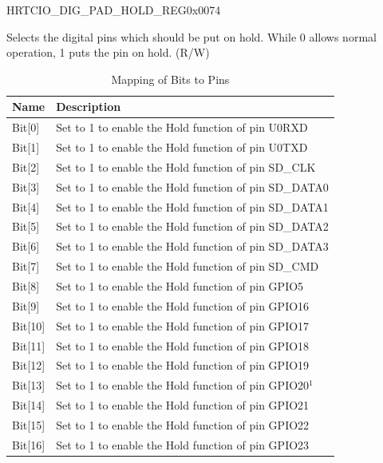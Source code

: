 \clearpage
\begin{register}{H}{RTCIO\_DIG\_PAD\_HOLD\_REG}{0x0074}\label{regdesc:RTCIODIGPADHOLDREG}
%
\regnewline%
\begin{regdesc}\begin{reglist}
\item [RTCIO\_DIG\_PAD\_HOLD\_REG]Selects the digital pins which should be put on hold. While 0 allows normal operation, 1 puts the pin on hold. (R/W)
\end{reglist}\end{regdesc}
\end{register}
\begin{longtable}[c]{ | p{5.5cm} | p{7.5cm} | }
\caption{Mapping of Bits to Pins}\label{tab:hold-bit-mapping}
\\\hline
\rowcolor{lightgray}
\textbf{Name} & \textbf{Description} \\ \hline
\endhead
Bit[0] & Set to 1 to enable the Hold function of pin U0RXD\\\hline
Bit[1] & Set to 1 to enable the Hold function of pin U0TXD\\\hline
Bit[2] & Set to 1 to enable the Hold function of pin SD\_CLK\\\hline
Bit[3] & Set to 1 to enable the Hold function of pin SD\_DATA0\\\hline
Bit[4] & Set to 1 to enable the Hold function of pin SD\_DATA1\\\hline
Bit[5] & Set to 1 to enable the Hold function of pin SD\_DATA2\\\hline
Bit[6] & Set to 1 to enable the Hold function of pin SD\_DATA3\\\hline
Bit[7] & Set to 1 to enable the Hold function of pin SD\_CMD\\\hline
Bit[8] & Set to 1 to enable the Hold function of pin GPIO5\\\hline
Bit[9] & Set to 1 to enable the Hold function of pin GPIO16\\\hline
Bit[10] & Set to 1 to enable the Hold function of pin GPIO17\\\hline
Bit[11] & Set to 1 to enable the Hold function of pin GPIO18\\\hline
Bit[12] & Set to 1 to enable the Hold function of pin GPIO19\\\hline
Bit[13] & Set to 1 to enable the Hold function of pin GPIO20$^1$\\\hline
Bit[14] & Set to 1 to enable the Hold function of pin GPIO21\\\hline
Bit[15] & Set to 1 to enable the Hold function of pin GPIO22\\\hline
Bit[16] & Set to 1 to enable the Hold function of pin GPIO23\\\hline
\end{longtable}

